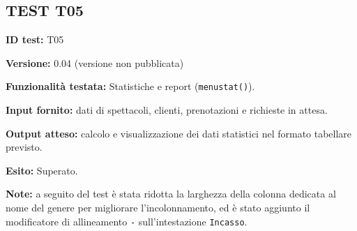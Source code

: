 \documentclass[11pt,a4paper,oneside,openany]{book}
\newenvironment{listacomp}{%
    \small
    \begin{list}{\textendash}{%
        \setlength{\topsep}{2pt}%
        \setlength{\partopsep}{0pt}%
        \setlength{\itemsep}{1pt}%
        \setlength{\parsep}{0pt}%
        \setlength{\leftmargin}{1.2em}%
    }%
}{%
    \end{list}%
}
\begin{document}
\subsection{TEST T05}
\begin{listacomp}
    \item \textbf{ID test:} T05
    \item \textbf{Versione:} 0.04 (versione non pubblicata)
    \item \textbf{Funzionalità testata:} Statistiche e report (\texttt{menustat()}).
    \item \textbf{Input fornito:} dati di spettacoli, clienti, prenotazioni e richieste in attesa.
    \item \textbf{Output atteso:} calcolo e visualizzazione dei dati statistici nel formato tabellare previsto.
    \item \textbf{Esito:} Superato.
    \item \textbf{Note:} a seguito del test è stata ridotta la larghezza della colonna dedicata al nome del genere per migliorare l'incolonnamento, ed è stato aggiunto il modificatore di allineamento \texttt{-} sull'intestazione \texttt{Incasso}.
\end{listacomp}
\end{document}
